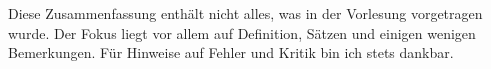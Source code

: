 \documentclass[12pt,a4paper]{article}
\theoremstyle{plain}
\theoremstyle{plain}
\theoremstyle{definition}
\theoremstyle{definition}
\theoremstyle{plain}
\begin{document}
	
	
	Diese Zusammenfassung enthält nicht alles, was in der Vorlesung vorgetragen wurde. Der Fokus liegt vor allem auf Definition, Sätzen und einigen wenigen Bemerkungen. Für Hinweise auf Fehler und Kritik bin ich stets dankbar.
	
	\tableofcontents
	
	
	
	
	
	
	
	
	
\end{document}

